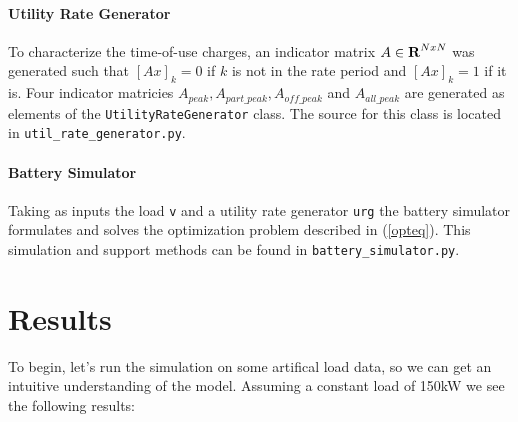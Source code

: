 \documentclass[12pt]{article}
\begin{document}
\paragraph{Utility Rate Generator}
To characterize the time-of-use charges, an indicator matrix $A \in {\mbox{\bf R}}^{NxN}$ was generated such that $[Ax]_k = 0$ if $k$ is not in the rate period and $[Ax]_k  = 1 $ if it is. Four indicator matricies $A_{peak}, A_{part\_peak}, A_{off\_peak}$ and $A_{all\_peak}$ are generated as elements of the \texttt{UtilityRateGenerator} class. The source for this class is located in \texttt{util\_rate\_generator.py}.


\paragraph{Battery Simulator}
Taking as inputs the load \texttt{v} and a utility rate generator \texttt{urg} the battery simulator formulates and solves the optimization problem described in (\ref{opteq}). This simulation and support methods can be found in  \texttt{battery\_simulator.py}.

\section{Results}
To begin, let's run the simulation on some artifical load data, so we can get an intuitive understanding of the model. Assuming a constant load of 150kW we see the following results:
\end{document}
